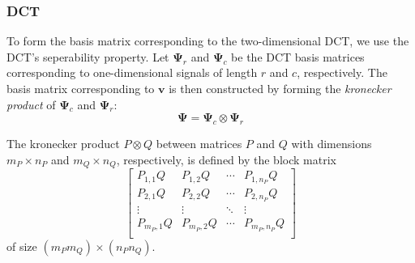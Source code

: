\subsubsection{DCT}
To form the basis matrix corresponding to the two-dimensional DCT, we use the DCT's seperability property.
Let $\bm\Psi_r$ and $\bm\Psi_c$ be the DCT basis matrices corresponding to one-dimensional signals of length $r$ and $c$, respectively.
The basis matrix corresponding to $\bm v$ is then constructed by forming the \emph{kronecker product} of $\bm\Psi_c$ and $\bm\Psi_r$:
\begin{equation*}
\label{eqn:dct3_basis}
  \bm\Psi = \bm\Psi_c \otimes \bm\Psi_r
\end{equation*}

The kronecker product $P \otimes Q$ between matrices $P$ and $Q$ with dimensions $m_P \times n_P$ and $m_Q \times n_Q$, respectively,  is defined by the block matrix
\begin{equation}
\label{eqn:kron}
\begin{bmatrix}
P_{1,1} Q & P_{1,2} Q & \cdots & P_{1,n_P} Q \\
P_{2,1} Q & P_{2,2} Q & \cdots & P_{2,n_P} Q \\
\vdots&\vdots&\ddots&\vdots \\
P_{m_P,1} Q & P_{m_P,2} Q & \cdots & P_{m_P,n_P} Q \\
\end{bmatrix}
\end{equation}
of size $(m_Pm_Q) \times (n_Pn_Q)$.

